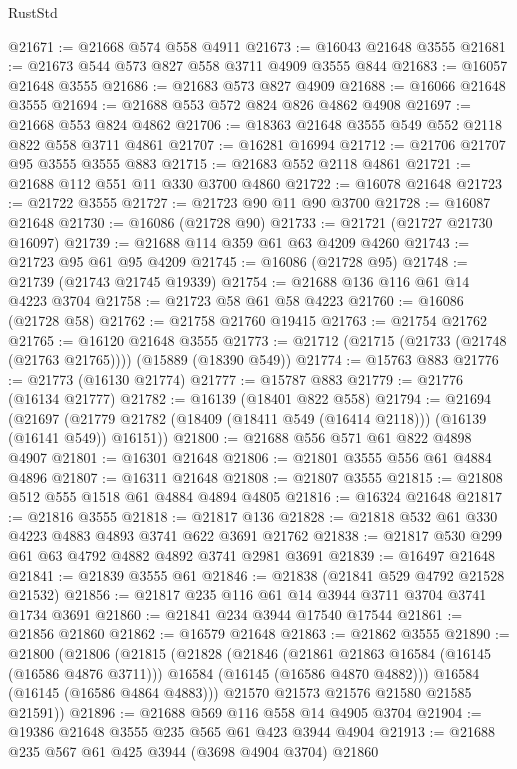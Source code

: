 \begin{lexlean}{RustStd}
\begin{coremodule}
@21671 := @21668 @574 @558 @4911
@21673 := @16043 @21648 @3555
@21681 := @21673 @544 @573 @827 @558 @3711 @4909 @3555 @844
@21683 := @16057 @21648 @3555
@21686 := @21683 @573 @827 @4909
@21688 := @16066 @21648 @3555
@21694 := @21688 @553 @572 @824 @826 @4862 @4908
@21697 := @21668 @553 @824 @4862
@21706 := @18363 @21648 @3555 @549 @552 @2118 @822 @558 @3711 @4861
@21707 := @16281 @16994
@21712 := @21706 @21707 @95 @3555 @3555 @883
@21715 := @21683 @552 @2118 @4861
@21721 := @21688 @112 @551 @11 @330 @3700 @4860
@21722 := @16078 @21648
@21723 := @21722 @3555
@21727 := @21723 @90 @11 @90 @3700
@21728 := @16087 @21648
@21730 := @16086 (@21728 @90)
@21733 := @21721 (@21727 @21730 @16097)
@21739 := @21688 @114 @359 @61 @63 @4209 @4260
@21743 := @21723 @95 @61 @95 @4209
@21745 := @16086 (@21728 @95)
@21748 := @21739 (@21743 @21745 @19339)
@21754 := @21688 @136 @116 @61 @14 @4223 @3704
@21758 := @21723 @58 @61 @58 @4223
@21760 := @16086 (@21728 @58)
@21762 := @21758 @21760 @19415
@21763 := @21754 @21762
@21765 := @16120 @21648 @3555
@21773 := @21712 (@21715 (@21733 (@21748 (@21763 @21765)))) (@15889 (@18390 @549))
@21774 := @15763 @883
@21776 := @21773 (@16130 @21774)
@21777 := @15787 @883
@21779 := @21776 (@16134 @21777)
@21782 := @16139 (@18401 @822 @558)
@21794 := @21694
    (@21697 (@21779 @21782 (@18409 (@18411 @549 (@16414 @2118))) (@16139 (@16141 @549)) @16151))
@21800 := @21688 @556 @571 @61 @822 @4898 @4907
@21801 := @16301 @21648
@21806 := @21801 @3555 @556 @61 @4884 @4896
@21807 := @16311 @21648
@21808 := @21807 @3555
@21815 := @21808 @512 @555 @1518 @61 @4884 @4894 @4805
@21816 := @16324 @21648
@21817 := @21816 @3555
@21818 := @21817 @136
@21828 := @21818 @532 @61 @330 @4223 @4883 @4893 @3741 @622 @3691 @21762
@21838 := @21817 @530 @299 @61 @63 @4792 @4882 @4892 @3741 @2981 @3691
@21839 := @16497 @21648
@21841 := @21839 @3555 @61
@21846 := @21838 (@21841 @529 @4792 @21528 @21532)
@21856 := @21817 @235 @116 @61 @14 @3944 @3711 @3704 @3741 @1734 @3691
@21860 := @21841 @234 @3944 @17540 @17544
@21861 := @21856 @21860
@21862 := @16579 @21648
@21863 := @21862 @3555
@21890 := @21800
    (@21806
      (@21815
        (@21828
          (@21846
            (@21861 @21863 @16584 (@16145 (@16586 @4876 @3711)))
            @16584
            (@16145 (@16586 @4870 @4882)))
          @16584
          (@16145 (@16586 @4864 @4883)))
        @21570
        @21573
        @21576
        @21580
        @21585
        @21591))
@21896 := @21688 @569 @116 @558 @14 @4905 @3704
@21904 := @19386 @21648 @3555 @235 @565 @61 @423 @3944 @4904
@21913 := @21688 @235 @567 @61 @425 @3944 (@3698 @4904 @3704) @21860

\end{coremodule}
\end{lexlean}
